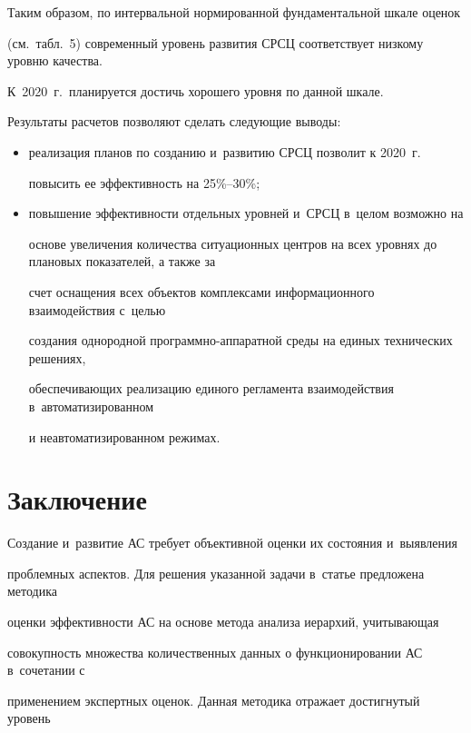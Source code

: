       

      Таким образом, по интервальной нормированной фундаментальной шкале оценок 

(см.\ табл.~5) современный уровень развития СРСЦ соответствует низкому уровню качества. 

К~2020~г.\ планируется достичь хорошего уровня по данной шкале.

      

      Результаты расчетов позволяют сделать следующие выводы:

      \begin{itemize}

      \item реализация планов по созданию и~развитию СРСЦ позволит к 2020~г.\ 

повысить ее эффективность на 25\%--30\%;

      \item повышение эффективности отдельных уровней и~СРСЦ в~целом возможно на 

основе увеличения количества ситуационных центров на всех уровнях до плановых показателей, а также за 

счет оснащения всех объектов комплексами информационного взаимодействия с~целью 

создания однородной программно-аппаратной среды на единых технических решениях, 

обеспечивающих реализацию единого регламента взаимодействия в~автоматизированном 

и неавтоматизированном режимах. 

\end{itemize}



\section{Заключение}



      Создание и~развитие АС требует объективной оценки их состояния и~выявления 

проблемных аспектов. Для решения указанной задачи в~статье предложена методика 

оценки эффективности АС на основе метода анализа иерархий, учитывающая 

совокупность множества количественных данных о функционировании АС в~сочетании с~

применением экспертных оценок. Данная методика отражает достигнутый уровень 

